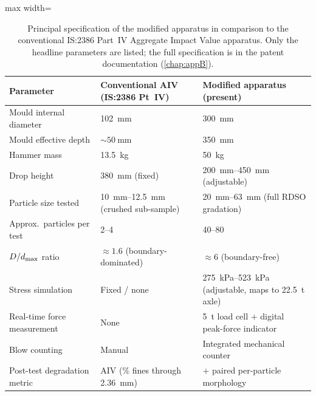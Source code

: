\begin{table}[ht]
\centering
\caption{Principal specification of the modified apparatus in comparison to
         the conventional IS:2386 Part~IV Aggregate Impact Value apparatus.
         Only the headline parameters are listed; the full specification is
         in the patent documentation (\cref{chap:appB}).}
\label{tab:meth-AIV-comparison}
\small
{}
\begin{adjustbox}{max width=\textwidth}
\begin{tabular}{@{}p{4.4cm}p{4.8cm}p{5.6cm}@{}}
    \toprule
    \rowcolor{tablehdr}
    {\color{white}\textbf{Parameter}}
    & {\color{white}\textbf{Conventional \acrshort{AIV} (IS:2386 Pt~IV)}}
    & {\color{white}\textbf{Modified apparatus (present)}}\\
    \midrule
    Mould internal diameter
        & \SI{102}{\milli\metre} & \SI{300}{\milli\metre}\\
    Mould effective depth
        & \(\sim\!\SI{50}{\milli\metre}\) & \SI{350}{\milli\metre}\\
    Hammer mass
        & \SI{13.5}{\kilogram} & \SI{50}{\kilogram}\\
    Drop height
        & \SI{380}{\milli\metre} (fixed)
        & \SIrange{200}{450}{\milli\metre} (adjustable)\\
    Particle size tested
        & \SIrange{10}{12.5}{\milli\metre} (crushed sub-sample)
        & \SIrange{20}{63}{\milli\metre} (full \acrshort{RDSO} gradation)\\
    Approx.\ particles per test
        & \numrange{2}{4} & \numrange{40}{80}\\
    $D/d_{\max}$ ratio
        & \(\approx 1.6\) (boundary-dominated)
        & \(\approx 6\) (boundary-free)\\
    Stress simulation
        & Fixed / none
        & \SIrange{275}{523}{\kilo\pascal} (adjustable, maps to
        \SI{22.5}{\tonne} axle)\\
    Real-time force measurement
        & None
        & \SI{5}{\tonne} load cell $+$ digital peak-force indicator\\
    Blow counting
        & Manual & Integrated mechanical counter\\
    Post-test degradation metric
        & \acrshort{AIV} (\(\%\) fines through \SI{2.36}{\milli\metre})
        & \FIIN{} $+$ paired per-particle morphology\\
    \bottomrule
\end{tabular}
\end{adjustbox}
\end{table}

